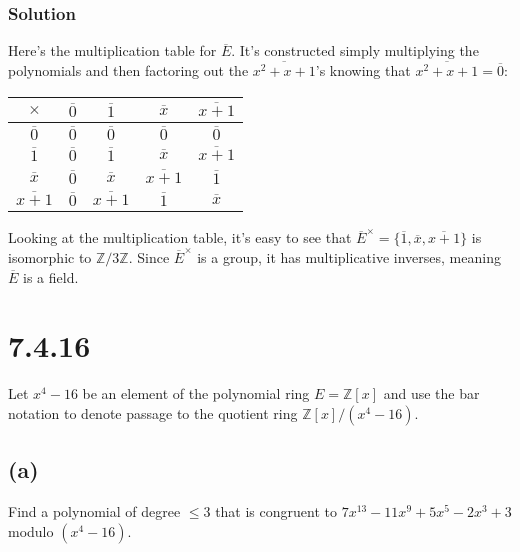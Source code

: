 \documentclass[fleqn]{article}
\begin{document}
            \subsubsection{Solution}
            Here's the multiplication table for $\overline{E}$.  It's constructed simply multiplying the polynomials and then factoring out the $\overline{x^2 + x + 1}$'s knowing that $\overline{x^2 + x + 1} = \overline{0}$: \\
            
            \begin{tabular}{c|c|c|c|c|}
                $\times$ & $\overline{0}$ & $\overline{1}$ & $\overline{x}$ & $\overline{x + 1}$ \\
                \hline $\overline{0}$ & $\overline{0}$ & $\overline{0}$ & $\overline{0}$ & $\overline{0}$ \\
                \hline $\overline{1}$ & $\overline{0}$ & $\overline{1}$ & $\overline{x}$ & $\overline{x + 1}$ \\
                \hline $\overline{x}$ & $\overline{0}$ & $\overline{x}$ & $\overline{x + 1}$ & $\overline{1}$ \\
                \hline $\overline{x + 1}$ & $\overline{0}$ & $\overline{x + 1}$ & $\overline{1}$ & $\overline{x}$ \\
                \hline
            \end{tabular}
            
            \noindent
            Looking at the multiplication table, it's easy to see that $\overline{E}^\times = \{\overline{1}, \overline{x}, \overline{x + 1}\}$ is isomorphic to $\mathbb{Z}/3\mathbb{Z}$.  Since $\overline{E}^\times$ is a group, it has multiplicative inverses, meaning $\overline{E}$ is a field.
    
    \section{7.4.16}
    Let $x^4 - 16$ be an element of the polynomial ring $E = \mathbb{Z}[x]$ and use the bar notation to denote passage to the quotient ring $\mathbb{Z}[x] / (x^4 - 16)$.
        
        \subsection{(a)}
        Find a polynomial of degree $\leq 3$ that is congruent to $7x^{13} - 11x^9 + 5x^5 - 2x^3 + 3$ modulo $(x^4 - 16)$.
            
\end{document}
